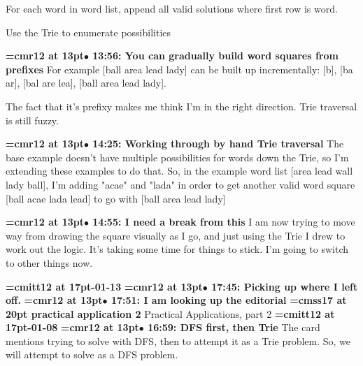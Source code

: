 For each word in word list, append all valid solutions where first row is word.
\par

Use the Trie to enumerate possibilities
\par

{\smallskip\noindent\bf\font\titlefont=cmr12 at 13pt\titlefont $\bullet$ 13:56: You can gradually build word squares from prefixes}\smallskip
For example [ball area lead lady] can be built up incrementally: [b], [ba ar], [bal are lea], [ball area lead lady].
\par

The fact that it's prefixy makes me think I'm in the right direction. Trie traversal is still fuzzy.
\par

{\smallskip\noindent\bf\font\titlefont=cmr12 at 13pt\titlefont $\bullet$ 14:25: Working through by hand Trie traversal}\smallskip
The base example doesn't have multiple possibilities for words down the Trie, so I'm extending these examples to do that. So, in the example word list [area lead wall lady ball], I'm adding "acae" and "lada" in order to get another valid word square  [ball acae lada lead] to go with [ball area lead lady]
\par

{\smallskip\noindent\bf\font\titlefont=cmr12 at 13pt\titlefont $\bullet$ 14:55: I need a break from this}\smallskip
I am now trying to move way from drawing the square visually as I go, and just using the Trie I drew to work out the logic. It's taking some time for things to stick. I'm going to switch to other things now.
\par

{\medskip\noindent\bf\font\titlefont=cmitt12 at 17pt-01-13}\medskip
{\smallskip\noindent\bf\font\titlefont=cmr12 at 13pt\titlefont $\bullet$ 17:45: Picking up where I left off.}\smallskip
{\smallskip\noindent\bf\font\titlefont=cmr12 at 13pt\titlefont $\bullet$ 17:51: I am looking up the editorial}\smallskip
{}
{\medskip\noindent\bf\font\titlefont=cmss17 at 20pt practical application 2}\medskip
Practical Applications, part 2
{\medskip\noindent\bf\font\titlefont=cmitt12 at 17pt-01-08}\medskip
{\smallskip\noindent\bf\font\titlefont=cmr12 at 13pt\titlefont $\bullet$ 16:59: DFS first, then Trie}\smallskip
The card mentions trying to solve with DFS, then to attempt it as a Trie problem. So, we will attempt to solve as a DFS problem.
\par

